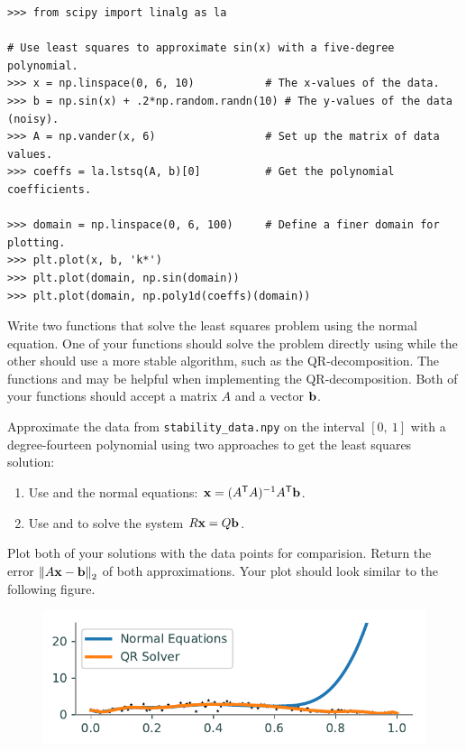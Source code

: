 \begin{lstlisting}
>>> from scipy import linalg as la

# Use least squares to approximate sin(x) with a five-degree polynomial.
>>> x = np.linspace(0, 6, 10)           # The x-values of the data.
>>> b = np.sin(x) + .2*np.random.randn(10) # The y-values of the data (noisy).
>>> A = np.vander(x, 6)                 # Set up the matrix of data values.
>>> coeffs = la.lstsq(A, b)[0]          # Get the polynomial coefficients.

>>> domain = np.linspace(0, 6, 100)     # Define a finer domain for plotting.
>>> plt.plot(x, b, 'k*')
>>> plt.plot(domain, np.sin(domain))
>>> plt.plot(domain, np.poly1d(coeffs)(domain))
\end{lstlisting}

\begin{problem}\label{problem:lstsqr}
Write two functions that solve the least squares problem using the normal equation.
One of your functions should solve the problem directly using  while the other should use a more stable algorithm, such as the QR-decomposition.
The functions  and  may be helpful when implementing the QR-decomposition.
Both of your functions should accept a matrix $A$ and a vector $\mathbf{b}$.

Approximate the data from \texttt{stability\_data.npy} on the interval $[0,\ 1]$ with a degree-fourteen polynomial using two approaches to get the least squares solution:
\begin{enumerate}
\item Use  and the normal equations: $\mathbf{x} = (A^{\mathsf T} A)^{-1}A^{\mathsf T} \mathbf{b}$.
\item Use  and  to solve the system $R\mathbf{x} = Q\mathbf{b}$.
\end{enumerate}
Plot both of your solutions with the data points for comparision.
Return the error $\left\lVert A\mathbf{x}-\mathbf{b}\right\rVert_2$ of both approximations.
Your plot should look similar to the following figure.

\begin{figure}[H] %
    \centering
    \includegraphics[width=.7\textwidth]{figures/lstsq_stability.pdf}
\end{figure}

\end{problem}

